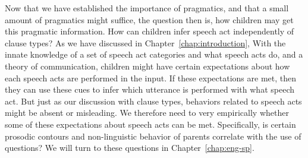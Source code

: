 
Now that we have established the importance of pragmatics, and that a small amount of pragmatics might suffice, the question then is, how children may get this pragmatic information. How can children infer speech act independently of clause types?  As we have discussed in Chapter~\ref{chap:introduction}, With the innate knowledge of a set of speech act categories and what speech acts do, and a theory of communication, children might have certain expectations about how each speech acts are performed in the input. If these expectations are met, then they can use these cues to infer which utterance is performed with what speech act. But just as our discussion with clause types, behaviors related to speech acts might be absent or misleading. We therefore need to very empirically whether some of these expectations about speech acts can be met. Specifically, is certain prosodic contours and non-linguistic behavior of parents correlate with the use of questions? We will turn to these questions in Chapter~\ref{chap:eng-sp}.



